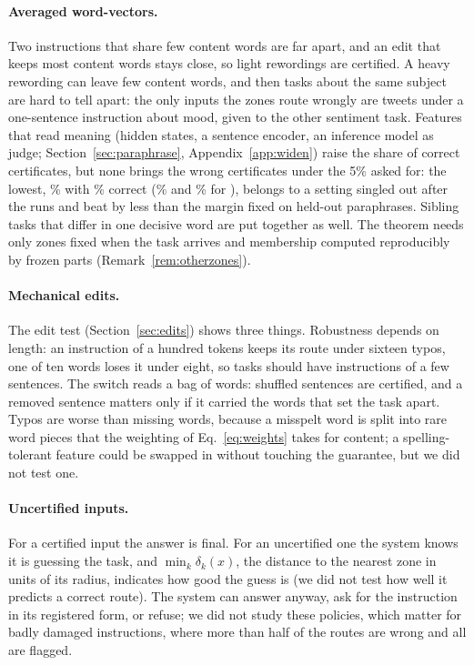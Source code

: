 \paragraph{Averaged word-vectors.} Two instructions that share few content words are far apart, and an
edit that keeps most content words stays close, so light rewordings are certified. A heavy rewording
can leave few content words, and then tasks about the same subject are hard to tell apart: the only
inputs the zones route wrongly are tweets under a one-sentence instruction about mood, given to the
other sentiment task. Features that read meaning (hidden states, a sentence encoder, an inference model
as judge; Section~\ref{sec:paraphrase}, Appendix~\ref{app:widen}) raise the share of correct
certificates, but none brings the wrong certificates under the 5\% asked for: the lowest,
\WidenEncRulerTwentyFrM{}\% with \WidenEncRulerTwentyFrP{}\% correct (\WidenRefTfiveFrM{}\% and
\WidenRefTfiveFrP{}\% for \cert{}), belongs to a setting singled out after the runs and beat \cert{}
by less than the margin fixed on held-out paraphrases. Sibling tasks that differ in one decisive word
are put together as well. The theorem needs only zones fixed when the task arrives and membership
computed reproducibly by frozen parts (Remark~\ref{rem:otherzones}).

\paragraph{Mechanical edits.} The edit test (Section~\ref{sec:edits}) shows three things. Robustness
depends on length: an instruction of a hundred tokens keeps its route under sixteen typos, one of ten
words loses it under eight, so tasks should have instructions of a few sentences. The switch reads a
bag of words: shuffled sentences are certified, and a removed sentence matters only if it carried the
words that set the task apart. Typos are worse than missing words, because a misspelt word is split
into rare word pieces that the weighting of Eq.~\eqref{eq:weights} takes for content; a
spelling-tolerant feature could be swapped in without touching the guarantee, but we did not test one.

\paragraph{Uncertified inputs.} For a certified input the answer is final. For an uncertified one the
system knows it is guessing the task, and $\min_k \delta_k(x)$, the distance to the nearest zone in
units of its radius, indicates how good the guess is (we did not test how well it predicts a correct
route). The system can answer anyway, ask for the instruction in its registered form, or refuse; we did
not study these policies, which matter for badly damaged instructions, where more than half of the
routes are wrong and all are flagged.

